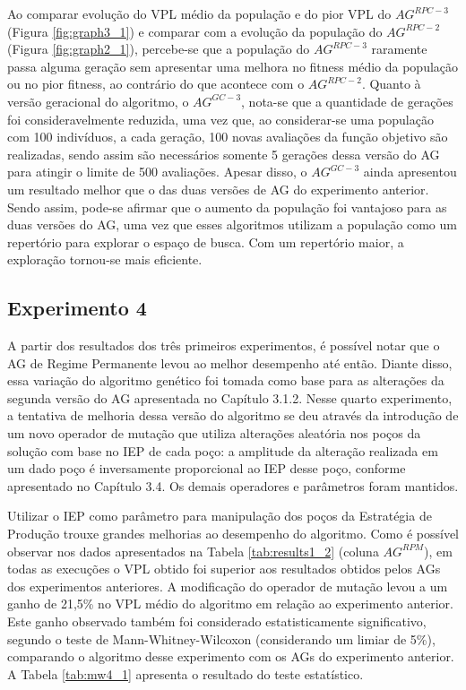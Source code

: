 Ao comparar evolução do VPL médio da população e do pior VPL do $AG^{RPC-3}$ (Figura \ref{fig:graph3_1}) e comparar com a evolução da população do $AG^{RPC-2}$ (Figura \ref{fig:graph2_1}), percebe-se que a população do $AG^{RPC-3}$ raramente passa alguma geração sem apresentar uma melhora no fitness médio da população ou no pior fitness, ao contrário do que acontece com o $AG^{RPC-2}$. Quanto à versão geracional do algoritmo, o $AG^{GC-3}$, nota-se que a quantidade de gerações foi consideravelmente reduzida, uma vez que, ao considerar-se uma população com 100 indivíduos, a cada geração, 100 novas avaliações da função objetivo são realizadas, sendo assim são necessários somente 5 gerações dessa versão do AG para atingir o limite de 500 avaliações. Apesar disso, o $AG^{GC-3}$ ainda apresentou um resultado melhor que o das duas versões de AG do experimento anterior. Sendo assim, pode-se afirmar que o aumento da população foi vantajoso para as duas versões do AG, uma vez que esses algoritmos utilizam a população como um repertório para explorar o espaço de busca. Com um repertório maior, a exploração tornou-se mais eficiente.

\subsection{Experimento 4}
\label{ch:5_Experimento4}
A partir dos resultados dos três primeiros experimentos, é possível notar que o AG de Regime Permanente levou ao melhor desempenho até então. Diante disso, essa variação do algoritmo genético foi tomada como base para as alterações da segunda versão do AG apresentada no Capítulo 3.1.2.  Nesse quarto experimento, a tentativa de melhoria dessa versão do algoritmo se deu através da introdução de um novo operador de mutação que utiliza alterações aleatória nos poços da solução com base no IEP de cada poço: a amplitude da alteração realizada em um dado poço é inversamente proporcional ao IEP desse poço, conforme apresentado no Capítulo 3.4. Os demais operadores e parâmetros foram mantidos.

Utilizar o IEP como parâmetro para manipulação dos poços da Estratégia de Produção trouxe grandes melhorias ao desempenho do algoritmo. Como é possível observar nos dados apresentados na Tabela \ref{tab:results1_2} (coluna $AG^{RPM}$), em todas as execuções o VPL obtido foi superior aos resultados obtidos pelos AGs dos experimentos anteriores. A modificação do operador de mutação levou a um ganho de 21,5\% no VPL médio do algoritmo em relação ao experimento anterior. Este ganho observado também foi considerado estatisticamente significativo, segundo o teste de Mann-Whitney-Wilcoxon (considerando um limiar de 5\%), comparando o algoritmo desse experimento com os AGs do experimento anterior. A Tabela \ref{tab:mw4_1} apresenta o resultado do teste estatístico.

